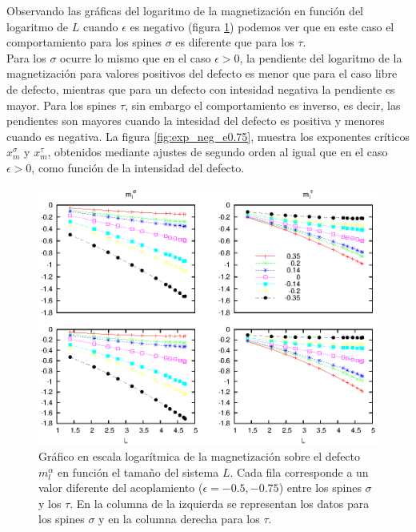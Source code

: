 Observando las gr\'aficas del logaritmo de la magnetizaci\'on en funci\'on del logaritmo de $L$ cuando $\epsilon$ es negativo (figura \ref{fig:ml_vs_L_neg_all})
 podemos ver que en este caso el comportamiento para los spines $\sigma$ es diferente que para los $\tau$.\\
Para los $\sigma$ ocurre
 lo mismo que en el caso $\epsilon>0$, la pendiente del logaritmo de la magnetizaci\'on para valores positivos del defecto
 es menor que para el caso libre de defecto, mientras que para un defecto con intesidad negativa la pendiente es mayor. Para los
 spines $\tau$, sin embargo el comportamiento es inverso, es decir, las pendientes son mayores cuando la intesidad del defecto
 es positiva y menores cuando es negativa.
La figura \ref{fig:exp_neg_e0.75}, muestra los exponentes cr\'iticos $x_{m}^{\sigma}$ y $x_{m}^{\tau}$, obtenidos mediante ajustes
 de segundo orden al igual que en el caso $\epsilon>0$, como funci\'on de la intensidad del defecto.\\


\begin{figure}[h!]
\begin{center}
\includegraphics[width=\figwidth]{graf/exp/ml_vs_L_neg_all.eps}
\end{center}
\caption{Gráfico en escala logarítmica de la magnetización sobre el defecto $m_{l}^{\alpha}$ en función el tamaño del sistema $L$. Cada fila corresponde
 a un valor diferente del acoplamiento ($\epsilon=-0.5, -0.75$) entre los spines $\sigma$ y los $\tau$. En la columna de la izquierda se representan
 los datos para los spines $\sigma$ y en la columna derecha para los $\tau$.}
\label{fig:ml_vs_L_neg_all}
\end{figure}

